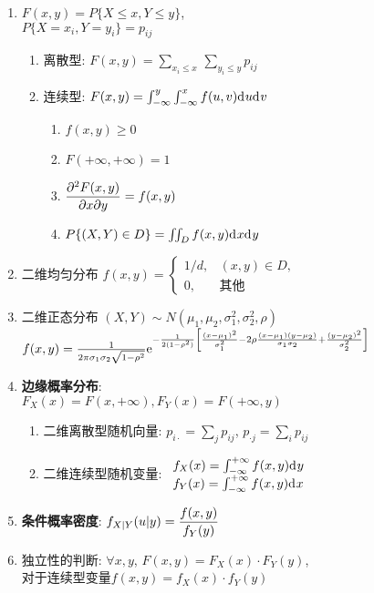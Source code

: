 \begin{enumerate}
\item $F(x,y)=P\{X\le x,Y\le y\}$,\\$P\{X=x_i,Y=y_i\}=p_{ij}$
\begin{enumerate}
\item 离散型: $F(x,y)=\sum_{x_i\le x}\,\sum_{y_i\le y}p_{ij}$
\item 连续型: $F(x,y)=\int_{-\infty}^{y}\int_{-\infty}^{x}f(u,v){\mathrm{d}\:\!} u{\mathrm{d}\:\!} v$
\begin{enumerate}
\item $f(x,y)\ge 0$
\item $F(+\infty,+\infty)=1$
\item $\displaystyle\frac{\partial^2 F(x,y)}{\partial x \partial y}=f(x,y)$
\item $P\{(X,Y)\in D\}=\iint_D f(x,y){\mathrm{d}\:\!} x{\mathrm{d}\:\!} y$
\end{enumerate}
\end{enumerate}
\item 二维均匀分布
$f(x,y)=\left\{\begin{array}{cl}
{1}/{d}, & (x,y)\in D,\\
0, & \text{其他}
\end{array}\right.$
\item 二维正态分布 $(X,Y)\sim N(\mu_1,\mu_2,\sigma_1^2,\sigma_2^2,\rho)$\\
$f(x,y)=\frac{1}{2\pi\sigma_1\sigma_2\sqrt{1-\rho^2}}{\mathrm{e}}^{-\frac{1}{2(1-\rho^2)}\left[\frac{(x-\mu_1)^2}{\sigma_1^2}-2\rho\frac{(x-\mu_1)(y-\mu_2)}{\sigma_1\sigma_2}+\frac{(y-\mu_2)^2}{\sigma_2^2}\right]}$
\item {\bf 边缘概率分布}:\\$F_X(x)=F(x,+\infty), F_Y(x)=F(+\infty,y)$
\begin{enumerate}
\item 二维离散型随机向量: $p_{i\cdot}=\sum_j p_{ij}$, $p_{\cdot j}=\sum_i p_{ij}$
\item 二维连续型随机变量: $\begin{array}{l}
f_X(x)=\int_{-\infty}^{+\infty}f(x,y){\mathrm{d}\:\!} y\\
f_Y(x)=\int_{-\infty}^{+\infty}f(x,y){\mathrm{d}\:\!} x
\end{array}$
\end{enumerate}
\item {\bf 条件概率密度}: $f_{X|Y}(u|y)=\displaystyle\frac{f(x,y)}{f_Y(y)}$
\item 独立性的判断: $\forall x,y$, $F(x,y)=F_X(x)\cdot F_Y(y)$, \\对于连续型变量$f(x,y)=f_X(x)\cdot f_Y(y)$


\end{enumerate}
